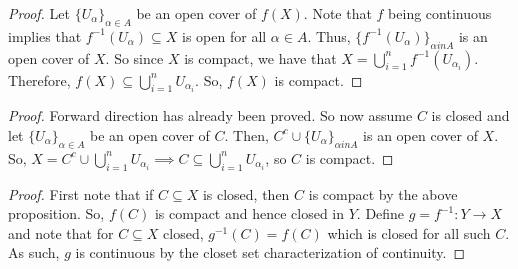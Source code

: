 \documentclass{report}
\begin{document}
\begin{proof}
    Let $\{U_\alpha\}_{\alpha \in A}$ be an open cover of $f(X)$. Note that $f$ being continuous implies that $f^{-1}(U_\alpha) \subseteq X$ is open for all $\alpha \in A$. Thus, $\{f^{-1}(U_\alpha)\}_{\alpha in A}$ is an open cover of $X$. So since $X$ is compact, we have that $X = \bigcup_{i=1}^n f^{-1}(U_{\alpha_i})$. Therefore, $f(X) \subseteq \bigcup_{i=1}^n U_{\alpha_i}$. So, $f(X)$ is compact.
\end{proof}
\begin{proof}
    Forward direction has already been proved. So now assume $C$ is closed and let $\{U_\alpha\}_{\alpha \in A}$ be an open cover of $C$. Then, $C^c \cup \{U_{\alpha}\}_{\alpha in A}$ is an open cover of $X$. So, $X = C^c \cup \bigcup_{i=1}^n U_{\alpha_i} \implies C \subseteq \bigcup_{i=1}^n U_{\alpha_i}$, so $C$ is compact.
\end{proof}
\begin{proof}
    First note that if $C \subseteq X$ is closed, then $C$ is compact by the above proposition. So, $f(C)$ is compact and hence closed in $Y$. Define $g = f^{-1}: Y \to X$ and note that for $C \subseteq X$ closed, $g^{-1}(C) = f(C)$ which is closed for all such $C$. As such, $g$ is continuous by the closet set characterization of continuity.
\end{proof}
\end{document}
